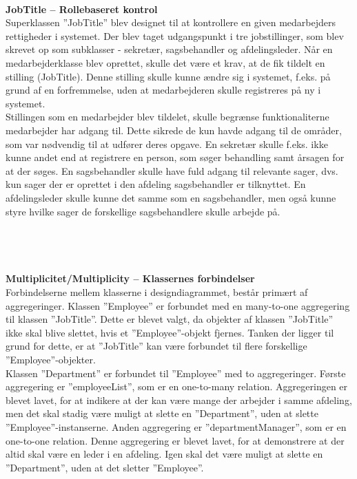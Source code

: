 \\
\textbf{JobTitle – Rollebaseret kontrol}\\
Superklassen ”JobTitle” blev designet til at kontrollere en given medarbejders rettigheder i systemet. Der blev taget udgangspunkt i tre jobstillinger, som blev skrevet op som subklasser - sekretær, sagsbehandler og afdelingsleder. Når en medarbejderklasse blev oprettet, skulle det være et krav, at de fik tildelt en stilling (JobTitle). Denne stilling skulle kunne ændre sig i systemet, f.eks. på grund af en forfremmelse, uden at medarbejderen skulle registreres på ny i systemet.\\
Stillingen som en medarbejder blev tildelet, skulle begrænse funktionaliterne medarbejder har adgang til. 
Dette sikrede de kun havde adgang til de områder, som var nødvendig til at udfører deres opgave. 
En sekretær skulle f.eks. ikke kunne andet end at registrere en person, som søger behandling samt årsagen for at der søges. En sagsbehandler skulle have fuld adgang til relevante sager, dvs. kun sager der er oprettet i den afdeling sagsbehandler er tilknyttet. En afdelingsleder skulle kunne det samme som en sagsbehandler, men også kunne styre hvilke sager de forskellige sagsbehandlere skulle arbejde på.\\
 \\ \\ \\ \\
\textbf{Multiplicitet/Multiplicity – Klassernes forbindelser}\\
Forbindelserne mellem klasserne i designdiagrammet, består primært af aggregeringer. Klassen ”Employee” er forbundet med en many-to-one aggregering til klassen ”JobTitle”. Dette er blevet valgt, da objekter af klassen ”JobTitle” ikke skal blive slettet, hvis et ”Employee”-objekt fjernes. Tanken der ligger til grund for dette, er at ”JobTitle” kan være forbundet til flere forskellige ”Employee”-objekter. \\
Klassen ”Department” er forbundet til ”Employee” med to aggregeringer. Første aggregering er ”employeeList”, som er en one-to-many relation. Aggregeringen er blevet lavet, for at indikere at der kan være mange der arbejder i samme afdeling, men det skal stadig være muligt at slette en ”Department”, uden at slette ”Employee”-instanserne. Anden aggregering er ”departmentManager”, som er en one-to-one relation. Denne aggregering er blevet lavet, for at demonstrere at der altid skal være en leder i en afdeling. Igen skal det være muligt at slette en ”Department”, uden at det sletter ”Employee”.\\

